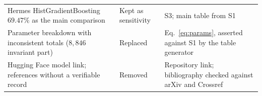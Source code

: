 \documentclass[10pt,twocolumn,letterpaper]{article}
\begin{document}
\begin{table}[p]
\begin{tabularx}{\textwidth}{@{}>{\raggedright\arraybackslash}p{5.6cm}>{\raggedright\arraybackslash}p{2.2cm}>{\raggedright\arraybackslash}X@{}}
Hermes HistGradientBoosting $69.47\%$ as the main comparison & Kept as sensitivity & S3; main table from S1 \\
Parameter breakdown with inconsistent totals ($8{,}846$ invariant part) & Replaced & Eq.~\eqref{eq:params}, asserted against S1 by the table generator \\
Hugging Face model link; references without a verifiable record & Removed & Repository link; bibliography checked against arXiv and Crossref \\
\bottomrule
\end{tabularx}
\end{table}
\end{document}
